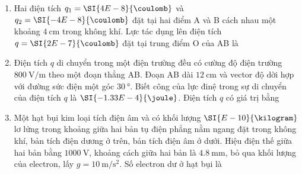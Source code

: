 \begin{enumerate}[label=\bfseries Câu \arabic*:, leftmargin=1.0cm]
\item Hai điện tích $q_1=\SI{4E-8}{\coulomb}$ và $q_2=\SI{-4E-8}{\coulomb}$ đặt tại hai điểm A và B cách nhau một khoảng $\SI{4}{\centi\meter}$ trong không khí. Lực tác dụng lên điện tích $q=\SI{2E-7}{\coulomb}$ đặt tại trung điểm O của AB là

\item Điện tích $q$ di chuyển trong một điện trường đều có cường độ điện trường $\SI{800}{\volt/\meter}$ theo một đoạn thẳng AB. Đoạn AB dài $\SI{12}{\centi\meter}$ và vector độ dời hợp với đường sức điện một góc $\SI{30}{\degree}$. Biết công của lực đinệ trong sự di chuyển của điện tích $q$ là $\SI{-1.33E-4}{\joule}$. Điện tích $q$ có giá trị bằng

\item Một hạt bụi kim loại tích điện âm và có khối lượng $\SI{E-10}{\kilogram}$ lơ lửng trong khoảng giữa hai bản tụ điện phẳng nằm ngang đặt trong không khí, bản tích điện dương ở trên, bản tích điện âm ở dưới. Hiệu điện thế giữa hai bản bằng $\SI{1000}{\volt}$, khoảng cách giữa hai bản là $\SI{4.8}{\milli\meter}$, bỏ qua khối lượng của electron, lấy $g=\SI{10}{\meter/\second^2}$. Số electron dư ở hạt bụi là


\end{enumerate}
